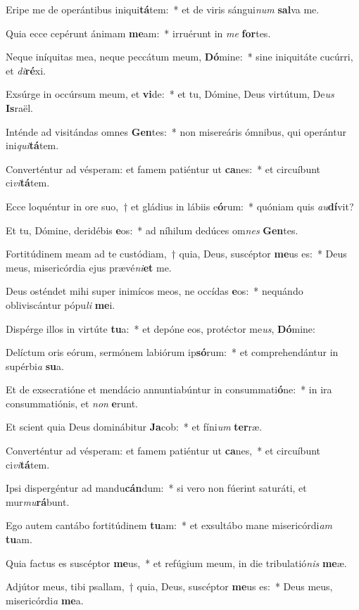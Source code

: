 \item Eripe me de operántibus iniqui\textbf{tá}tem:~* et de viris sángui\textit{num} \textbf{sal}va me.
\item Quia ecce cepérunt ánimam \textbf{me}am:~* irruérunt in \textit{me} \textbf{for}tes.
\item Neque iníquitas mea, neque peccátum meum, \textbf{Dó}mine:~* sine iniquitáte cucúrri, et \textit{di}\textbf{ré}xi.
\item Exsúrge in occúrsum meum, et \textbf{vi}de:~* et tu, Dómine, Deus virtútum, De\textit{us} \textbf{Is}raël.
\item Inténde ad visitándas omnes \textbf{Gen}tes:~* non misereáris ómnibus, qui operántur ini\textit{qui}\textbf{tá}tem.
\item Converténtur ad vésperam: et famem patiéntur ut \textbf{ca}nes:~* et circuíbunt ci\textit{vi}\textbf{tá}tem.
\item Ecce loquéntur in ore suo,~† et gládius in lábiis e\textbf{ó}rum:~* quóniam quis \textit{au}\textbf{dí}vit?
\item Et tu, Dómine, deridébis \textbf{e}os:~* ad níhilum dedúces om\textit{nes} \textbf{Gen}tes.
\item Fortitúdinem meam ad te custódiam,~† quia, Deus, suscéptor \textbf{me}us es:~* Deus meus, misericórdia ejus prævé\textit{ni}\textbf{et} me.
\item Deus osténdet mihi super inimícos meos, ne occídas \textbf{e}os:~* nequándo obliviscántur pópu\textit{li} \textbf{me}i.
\item Dispérge illos in virtúte \textbf{tu}a:~* et depóne eos, protéctor me\textit{us}, \textbf{Dó}mine:
\item Delíctum oris eórum, sermónem labiórum ip\textbf{só}rum:~* et comprehendántur in supérbi\textit{a} \textbf{su}a.
\item Et de exsecratióne et mendácio annuntiabúntur in consummati\textbf{ó}ne:~* in ira consummatiónis, et \textit{non} \textbf{e}runt.
\item Et scient quia Deus dominábitur \textbf{Ja}cob:~* et fíni\textit{um} \textbf{ter}ræ.
\item Converténtur ad vésperam: et famem patiéntur ut \textbf{ca}nes,~* et circuíbunt ci\textit{vi}\textbf{tá}tem.
\item Ipsi dispergéntur ad mandu\textbf{cán}dum:~* si vero non fúerint saturáti, et mur\textit{mu}\textbf{rá}bunt.
\item Ego autem cantábo fortitúdinem \textbf{tu}am:~* et exsultábo mane misericórdi\textit{am} \textbf{tu}am.
\item Quia factus es suscéptor \textbf{me}us,~* et refúgium meum, in die tribulatió\textit{nis} \textbf{me}æ.
\item Adjútor meus, tibi psallam,~† quia, Deus, suscéptor \textbf{me}us es:~* Deus meus, misericórdi\textit{a} \textbf{me}a.
